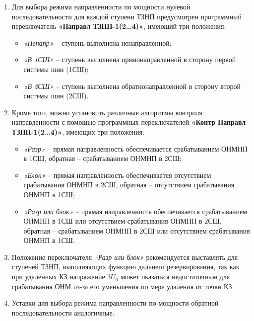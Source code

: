 \begin{enumerate}
\begin{enumerate}
\begin{figure}[H]
\caption{Характеристики срабатывания ОНМНП}
\label{pict_tnznp:ONMNP}
\end{figure}

\medskip

\item
Для выбора режима направленности по мощности нулевой последовательности для каждой ступени
ТЗНП предусмотрен программный переключатель \textbf{«Направл ТЗНП-1(2…4)»}, имеющий три положения:
\begin{itemize}
    \item \textit{«Ненапр»} -- ступень выполнена ненаправленной;
    \item \textit{«В 1СШ»} -- ступень выполнена прямонаправленной в сторону первой системы шин (1СШ);
    \item \textit{«В 2СШ»} -- ступень выполнена обратнонаправленной в сторону второй системы шин (2СШ).
\end{itemize}

\item
Кроме того, можно установить различные алгоритмы контроля направленности с помощью программных
переключателей \textbf{«Контр Направл ТЗНП-1(2…4)»}, имеющих три положения:
\begin{itemize}
    \item \textit{«Разр»} --  прямая направленность обеспечивается срабатыванием ОНМНП в 1СШ, обратная -- срабатыванием ОНМНП в 2СШ;
    \item \textit{«Блок»} -- прямая направленность обеспечивается отсутствием срабатывания ОНМНП в 2СШ, обратная -- отсутствием срабатывания ОНМНП в 1СШ;
    \item \textit{«Разр или блок»} -- прямая направленность обеспечивается срабатыванием ОНМНП в 1СШ или отсутствием срабатывания ОНМНП в 2СШ, обратная -- срабатыванием ОНМНП в 2СШ или отсутствием срабатывания ОНМНП в 1СШ.
\end{itemize}

\item
Положение переключателя \textit{«Разр или блок»} рекомендуется выставлять для ступеней ТЗНП,
выполняющих функцию дальнего резервирования, так как при удаленных КЗ напряжение $3U_0$ может оказаться
недостаточным для срабатывания ОНМ из-за его уменьшения по мере удаления от точки КЗ.

\item
Уставки для выбора режима направленности по мощности обратной последовательности аналогичные.


\end{enumerate}
\end{enumerate}
